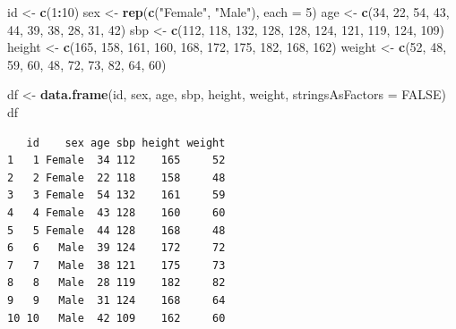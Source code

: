 \documentclass[
  11pt,
]{krantz}
\newenvironment{Shaded}{\begin{snugshade}}{\end{snugshade}}
\newcommand{\DataTypeTok}[1]{\textcolor[rgb]{0.27,0.27,0.27}{#1}}
\newcommand{\DecValTok}[1]{\textcolor[rgb]{0.06,0.06,0.06}{#1}}
\newcommand{\KeywordTok}[1]{\textcolor[rgb]{0.27,0.27,0.27}{\textbf{#1}}}
\newcommand{\NormalTok}[1]{#1}
\newcommand{\OperatorTok}[1]{\textcolor[rgb]{0.43,0.43,0.43}{\textbf{#1}}}
\newcommand{\OtherTok}[1]{\textcolor[rgb]{0.37,0.37,0.37}{#1}}
\newcommand{\StringTok}[1]{\textcolor[rgb]{0.5,0.5,0.5}{#1}}
\begin{document}
\begin{Shaded}
\begin{Highlighting}[]
\NormalTok{id <-}\StringTok{ }\KeywordTok{c}\NormalTok{(}\DecValTok{1}\OperatorTok{:}\DecValTok{10}\NormalTok{)}
\NormalTok{sex <-}\StringTok{ }\KeywordTok{rep}\NormalTok{(}\KeywordTok{c}\NormalTok{(}\StringTok{"Female"}\NormalTok{, }\StringTok{"Male"}\NormalTok{), }\DataTypeTok{each =} \DecValTok{5}\NormalTok{)}
\NormalTok{age <-}\StringTok{ }\KeywordTok{c}\NormalTok{(}\DecValTok{34}\NormalTok{, }\DecValTok{22}\NormalTok{, }\DecValTok{54}\NormalTok{, }\DecValTok{43}\NormalTok{, }\DecValTok{44}\NormalTok{, }\DecValTok{39}\NormalTok{, }\DecValTok{38}\NormalTok{, }\DecValTok{28}\NormalTok{, }\DecValTok{31}\NormalTok{, }\DecValTok{42}\NormalTok{)}
\NormalTok{sbp <-}\StringTok{ }\KeywordTok{c}\NormalTok{(}\DecValTok{112}\NormalTok{, }\DecValTok{118}\NormalTok{, }\DecValTok{132}\NormalTok{, }\DecValTok{128}\NormalTok{, }\DecValTok{128}\NormalTok{, }\DecValTok{124}\NormalTok{, }\DecValTok{121}\NormalTok{, }\DecValTok{119}\NormalTok{, }\DecValTok{124}\NormalTok{, }\DecValTok{109}\NormalTok{)}
\NormalTok{height <-}\StringTok{ }\KeywordTok{c}\NormalTok{(}\DecValTok{165}\NormalTok{, }\DecValTok{158}\NormalTok{, }\DecValTok{161}\NormalTok{, }\DecValTok{160}\NormalTok{, }\DecValTok{168}\NormalTok{, }\DecValTok{172}\NormalTok{, }\DecValTok{175}\NormalTok{, }\DecValTok{182}\NormalTok{, }\DecValTok{168}\NormalTok{, }\DecValTok{162}\NormalTok{)}
\NormalTok{weight <-}\StringTok{ }\KeywordTok{c}\NormalTok{(}\DecValTok{52}\NormalTok{, }\DecValTok{48}\NormalTok{, }\DecValTok{59}\NormalTok{, }\DecValTok{60}\NormalTok{, }\DecValTok{48}\NormalTok{, }\DecValTok{72}\NormalTok{, }\DecValTok{73}\NormalTok{, }\DecValTok{82}\NormalTok{, }\DecValTok{64}\NormalTok{, }\DecValTok{60}\NormalTok{)}

\NormalTok{df <-}\StringTok{ }\KeywordTok{data.frame}\NormalTok{(id, sex, age, sbp, height, weight, }
                 \DataTypeTok{stringsAsFactors =} \OtherTok{FALSE}\NormalTok{)}
\NormalTok{df}
\end{Highlighting}
\end{Shaded}

\begin{verbatim}
   id    sex age sbp height weight
1   1 Female  34 112    165     52
2   2 Female  22 118    158     48
3   3 Female  54 132    161     59
4   4 Female  43 128    160     60
5   5 Female  44 128    168     48
6   6   Male  39 124    172     72
7   7   Male  38 121    175     73
8   8   Male  28 119    182     82
9   9   Male  31 124    168     64
10 10   Male  42 109    162     60
\end{verbatim}
\end{document}
